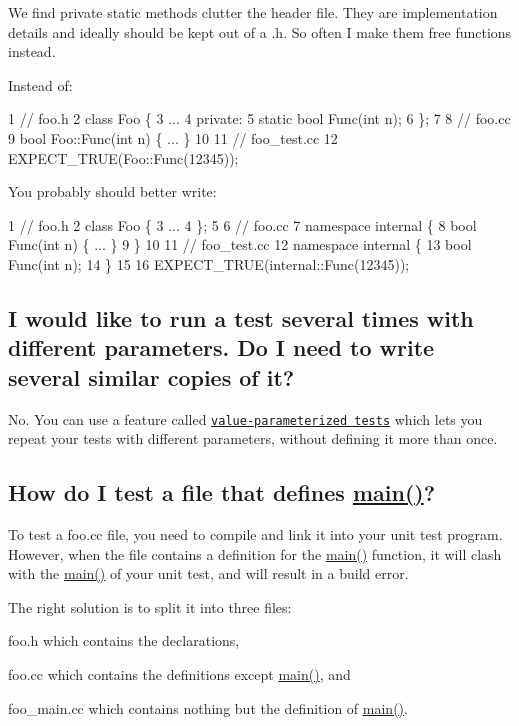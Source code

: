 We find private static methods clutter the header file. They are implementation details and ideally should be kept out of a .h. So often I make them free functions instead.

Instead of\+: 
\begin{DoxyCode}
1 // foo.h
2 class Foo \{
3   ...
4  private:
5   static bool Func(int n);
6 \};
7 
8 // foo.cc
9 bool Foo::Func(int n) \{ ... \}
10 
11 // foo\_test.cc
12 EXPECT\_TRUE(Foo::Func(12345));
\end{DoxyCode}


You probably should better write\+: 
\begin{DoxyCode}
1 // foo.h
2 class Foo \{
3   ...
4 \};
5 
6 // foo.cc
7 namespace internal \{
8   bool Func(int n) \{ ... \}
9 \}
10 
11 // foo\_test.cc
12 namespace internal \{
13   bool Func(int n);
14 \}
15 
16 EXPECT\_TRUE(internal::Func(12345));
\end{DoxyCode}


\subsection*{I would like to run a test several times with different parameters. Do I need to write several similar copies of it?}

No. You can use a feature called \href{AdvancedGuide.md#Value_Parameterized_Tests}{\tt value-\/parameterized tests} which lets you repeat your tests with different parameters, without defining it more than once.

\subsection*{How do I test a file that defines \hyperlink{app_2main_8cpp_ae66f6b31b5ad750f1fe042a706a4e3d4}{main()}?}

To test a {\ttfamily foo.\+cc} file, you need to compile and link it into your unit test program. However, when the file contains a definition for the {\ttfamily \hyperlink{app_2main_8cpp_ae66f6b31b5ad750f1fe042a706a4e3d4}{main()}} function, it will clash with the {\ttfamily \hyperlink{app_2main_8cpp_ae66f6b31b5ad750f1fe042a706a4e3d4}{main()}} of your unit test, and will result in a build error.

The right solution is to split it into three files\+:
\begin{DoxyEnumerate}
\item {\ttfamily foo.\+h} which contains the declarations,
\end{DoxyEnumerate}
\begin{DoxyEnumerate}
\item {\ttfamily foo.\+cc} which contains the definitions except {\ttfamily \hyperlink{app_2main_8cpp_ae66f6b31b5ad750f1fe042a706a4e3d4}{main()}}, and
\end{DoxyEnumerate}
\begin{DoxyEnumerate}
\item {\ttfamily foo\+\_\+main.\+cc} which contains nothing but the definition of {\ttfamily \hyperlink{app_2main_8cpp_ae66f6b31b5ad750f1fe042a706a4e3d4}{main()}}.
\end{DoxyEnumerate}

